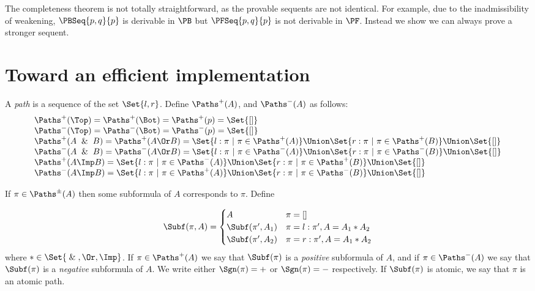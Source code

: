 The completeness theorem is not totally straightforward, as the provable sequents
are not identical.  For example, due to the inadmissibility of weakening,
$\PBSeq{p, q}{p}$ is derivable in $\PB$ but
$\PFSeq{p, q}{p}$ is not derivable in $\PF$.
Instead we show we can always prove a stronger sequent.

%

\section{Toward an efficient implementation}

\begin{definition}[Paths]
  A \emph{path} is a sequence of the set $\Set{l,r}$.
  Define $\Paths^+(A)$, and $\Paths^-(A)$ as follows:
  \[
  \begin{array}{l}
    \Paths^+(\Top) = \Paths^+(\Bot) = \Paths^+(p) = \Set{[]}\\
    \Paths^-(\Top) = \Paths^-(\Bot) = \Paths^-(p) = \Set{[]}\\
    \Paths^+(A\And B) = \Paths^+(A\Or B) =
    \Set{l : \pi\ |\ \pi\in\Paths^+(A)} \Union
    \Set{r : \pi\ |\ \pi\in\Paths^+(B)} \Union \Set{[]}\\
    \Paths^-(A\And B) = \Paths^-(A\Or B) =
    \Set{l : \pi\ |\ \pi\in\Paths^-(A)} \Union
    \Set{r : \pi\ |\ \pi\in\Paths^-(B)} \Union \Set{[]}\\
    \Paths^+(A\Imp B) =
    \Set{l : \pi\ |\ \pi\in\Paths^-(A)} \Union
    \Set{r : \pi\ |\ \pi\in\Paths^+(B)} \Union \Set{[]}\\
    \Paths^-(A\Imp B) =
    \Set{l : \pi\ |\ \pi\in\Paths^+(A)} \Union
    \Set{r : \pi\ |\ \pi\in\Paths^-(B)} \Union \Set{[]}\\
  \end{array}
  \]
\end{definition}

\noindent
If $\pi\in\Paths^\pm(A)$ then some subformula of $A$ corresponds to
$\pi$.  Define

\[
\Subf(\pi, A) =
\begin{cases}
  A & \pi = []\\
  \Subf(\pi', A_1) & \pi = l : \pi', A = A_1 * A_2\\
  \Subf(\pi', A_2) & \pi = r : \pi', A = A_1 * A_2\\
\end{cases}
\]
\noindent
where $* \in \Set{\And,\Or,\Imp}$.
If $\pi\in\Paths^+(A)$ we say that $\Subf(\pi)$ is
a \emph{positive} subformula of $A$, and
if $\pi\in\Paths^-(A)$ we say that $\Subf(\pi)$ is
a \emph{negative} subformula of $A$.  We write either
$\Sgn(\pi)=+$ or $\Sgn(\pi)=-$ respectively.
If $\Subf(\pi)$ is atomic, we say that $\pi$ is an atomic path.

